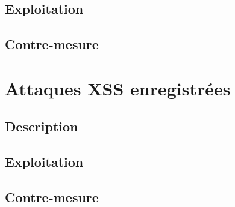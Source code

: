 \subsection{Exploitation}

\subsection{Contre-mesure}


\section{Attaques XSS enregistrées }

\subsection{Description}

\subsection{Exploitation}

\subsection{Contre-mesure}

